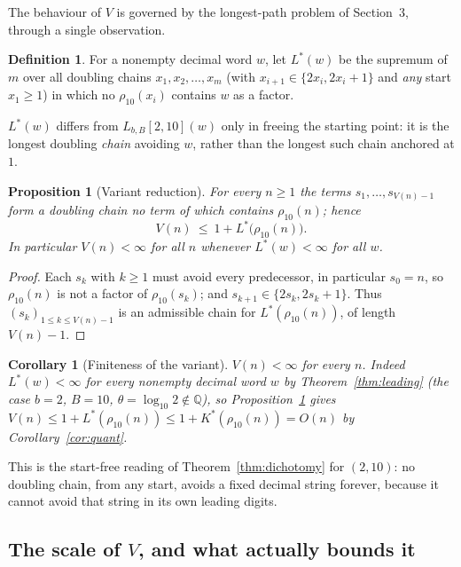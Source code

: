\documentclass[11pt]{article}
\theoremstyle{plain}
\newtheorem{proposition}{Proposition}
\newtheorem{corollary}{Corollary}
\theoremstyle{definition}
\newtheorem{definition}{Definition}
\theoremstyle{remark}
\newcommand{\QQ}{\mathbb{Q}}
\newcommand{\Lbb}{L_{b,B}}
\begin{document}
The behaviour of $V$ is governed by the longest-path problem of Section~3, through a single observation.

\begin{definition}
For a nonempty decimal word $w$, let $L^{*}(w)$ be the supremum of $m$ over all doubling chains $x_1,x_2,\dots,x_m$ (with $x_{i+1}\in\{2x_i,2x_i+1\}$ and \emph{any} start $x_1\ge1$) in which no $\rho_{10}(x_i)$ contains $w$ as a factor.
\end{definition}

$L^{*}(w)$ differs from $\Lbb[2,10](w)$ only in freeing the starting point: it is the longest doubling \emph{chain} avoiding $w$, rather than the longest such chain anchored at $1$.

\begin{proposition}[Variant reduction]\label{prop:variant}
For every $n\ge1$ the terms $s_1,\dots,s_{V(n)-1}$ form a doubling chain no term of which contains $\rho_{10}(n)$; hence
\[
V(n)\ \le\ 1+L^{*}\!\bigl(\rho_{10}(n)\bigr).
\]
In particular $V(n)<\infty$ for all $n$ whenever $L^{*}(w)<\infty$ for all $w$.
\end{proposition}

\begin{proof}
Each $s_k$ with $k\ge1$ must avoid every predecessor, in particular $s_0=n$, so $\rho_{10}(n)$ is not a factor of $\rho_{10}(s_k)$; and $s_{k+1}\in\{2s_k,2s_k+1\}$. Thus $(s_k)_{1\le k\le V(n)-1}$ is an admissible chain for $L^{*}(\rho_{10}(n))$, of length $V(n)-1$.
\end{proof}

\begin{corollary}[Finiteness of the variant]\label{cor:variant}
$V(n)<\infty$ for every $n$. Indeed $L^{*}(w)<\infty$ for every nonempty decimal word $w$ by Theorem~\ref{thm:leading} (the case $b=2$, $B=10$, $\theta=\log_{10}2\notin\QQ$), so Proposition~\ref{prop:variant} gives $V(n)\le 1+L^{*}(\rho_{10}(n))\le 1+K^{*}(\rho_{10}(n))=O(n)$ by Corollary~\ref{cor:quant}.
\end{corollary}

This is the start-free reading of Theorem~\ref{thm:dichotomy} for $(2,10)$: no doubling chain, from any start, avoids a fixed decimal string forever, because it cannot avoid that string in its own leading digits.

\subsection{The scale of \texorpdfstring{$V$}{V}, and what actually bounds it}
\end{document}
